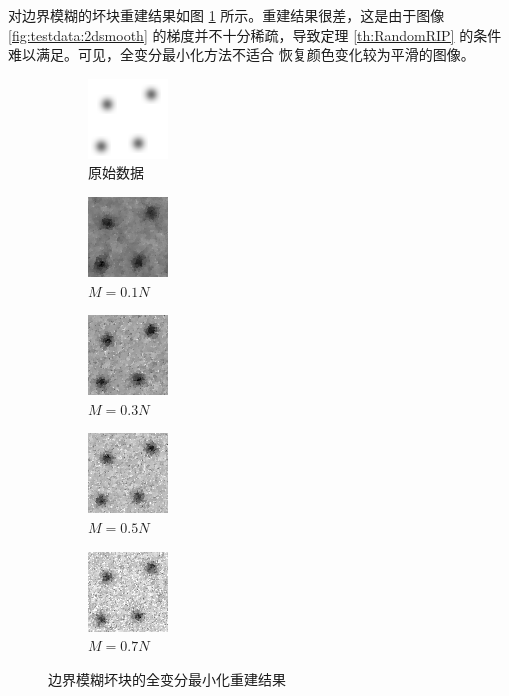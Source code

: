 对边界模糊的坏块重建结果如图 \ref{fig:TV2dsmooth}
所示。重建结果很差，这是由于图像
\ref{fig:testdata:2dsmooth} 的梯度并不十分稀疏，导致定理
\ref{th:RandomRIP} 的条件难以满足。可见，全变分最小化方法不适合
恢复颜色变化较为平滑的图像。

\begin{figure}
\centering
\begin{subfigure}[t]{1.1in}
	\includegraphics{Figure/testdata/2dsmooth.png}
	\caption{原始数据}
\end{subfigure}
\begin{subfigure}[t]{1.1in}
	\includegraphics{Figure/TV/2dsmooth10.png}
	\caption{$M = 0.1 N$}
\end{subfigure}
\begin{subfigure}[t]{1.1in}
	\includegraphics{Figure/TV/2dsmooth30.png}
	\caption{$M = 0.3 N$}
\end{subfigure}
\begin{subfigure}[t]{1.1in}
	\includegraphics{Figure/TV/2dsmooth50.png}
	\caption{$M = 0.5 N$}
\end{subfigure}
\begin{subfigure}[t]{1.1in}
	\includegraphics{Figure/TV/2dsmooth70.png}
	\caption{$M = 0.7 N$}
\end{subfigure}
\caption{边界模糊坏块的全变分最小化重建结果}
\label{fig:TV2dsmooth}
\end{figure}

